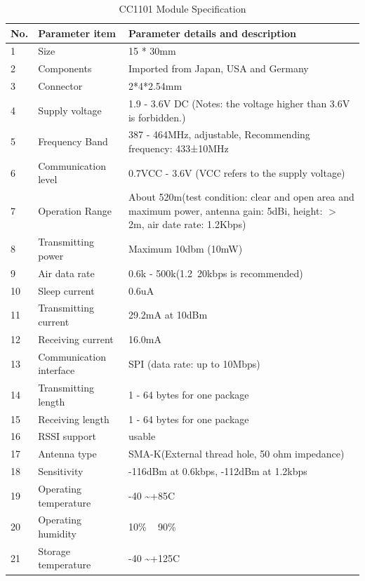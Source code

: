 \begin{table}[ht]
\centering
    \begin{tabular}{ | p{2cm} | p{5cm} | p{7cm} |}
    \hline
    No. & Parameter item & Parameter details and description\\ \hline
    1 & Size & 15 * 30mm\\ \hline
    2 & Components & Imported from Japan, USA and Germany\\ \hline
    3 & Connector & 2*4*2.54mm\\ \hline
    4 & Supply voltage & 1.9 - 3.6V DC (Notes: the voltage higher than 3.6V is forbidden.)\\ \hline
    5 & Frequency Band & 387 - 464MHz, adjustable, Recommending frequency: 433±10MHz\\ \hline
    6 & Communication level & 0.7VCC - 3.6V (VCC refers to the supply voltage)\\ \hline
    7 & Operation Range & About 520m(test condition: clear and open area and maximum power, antenna gain: 5dBi, height: $>$ 2m, air date rate:     1.2Kbps)\\ \hline
    8 & Transmitting power & Maximum 10dbm (10mW)\\ \hline
    9 & Air data rate & 0.6k - 500k(1.2~20kbps is recommended)\\ \hline
    10 & Sleep current & 0.6uA\\ \hline
    11 & Transmitting current & 29.2mA at 10dBm\\ \hline
    12 & Receiving current & 16.0mA  \\ \hline
    13 & Communication interface & SPI (data rate: up to 10Mbps)\\ \hline
    14 & Transmitting length & 1 - 64 bytes for one package\\ \hline
    15 & Receiving length & 1 - 64 bytes for one package\\ \hline
    16 & RSSI support & usable\\ \hline
    17 & Antenna type & SMA-K(External thread hole, 50 ohm impedance)\\ \hline
    18 & Sensitivity & -116dBm at 0.6kbps, -112dBm at 1.2kbps\\ \hline
    19 & Operating temperature & -40 \textasciitilde +85\textdegree{}C \\ \hline
    20 & Operating humidity & 10\% ~ 90\%\\ \hline
    21 & Storage temperature & -40 \textasciitilde +125\textdegree{}C \\ \hline
    \hline
    \end{tabular}
\caption{CC1101 Module Specification}
\label{tab:cc1101_spec}\cite{cc1101_module}
\end{table}


